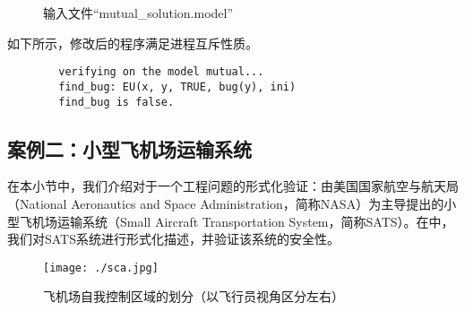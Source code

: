 \begin{example}
\begin{figure}[h!]
\begin{boxedverbatim}
		\end{boxedverbatim}
		\caption{输入文件“mutual\_solution.model”}
		\label{fig:mutual:solution}
	\end{figure}
	
	如下所示，修改后的程序满足进程互斥性质。
	\begin{center}
		\small
		\begin{verbatim}
		verifying on the model mutual...
		find_bug: EU(x, y, TRUE, bug(y), ini)
		find_bug is false.
		\end{verbatim}
	\end{center}
\end{example}

\subsection{案例二：小型飞机场运输系统}
在本小节中，我们介绍对于一个工程问题的形式化验证：由美国国家航空与航天局（National Aeronautics and Space Administration，简称NASA）为主导提出的小型飞机场运输系统（Small Aircraft Transportation System，简称SATS）\cite{MunozDC04,nasasats04}。在\sctlprov{}中，我们对SATS系统进行形式化描述，并验证该系统的安全性。



\begin{figure}
	\centering
	\texttt{[image: ./sca.jpg]}
	\caption{飞机场自我控制区域的划分（以飞行员视角区分左右）}
	\label{fig:example:sats:sca}
\end{figure}

